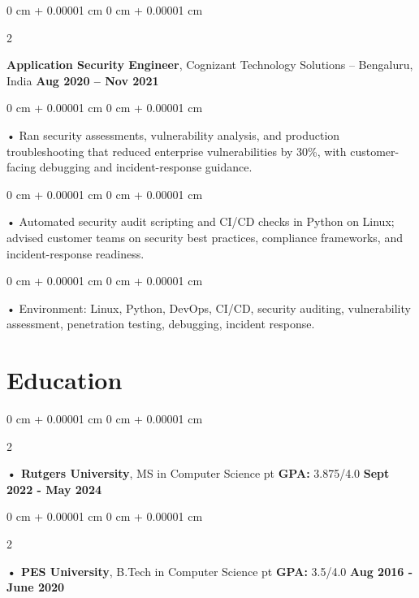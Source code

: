 \documentclass[10pt, letterpaper]{article}
\newenvironment{onecolentry}{
    \begin{adjustwidth}{
        0 cm + 0.00001 cm
    }{
        0 cm + 0.00001 cm
    }
}{
    \end{adjustwidth}
} %
\newenvironment{twocolentry}[2][]{
    \onecolentry
    \def\secondColumn{#2}
    \setcolumnwidth{\fill, 4.5 cm}
    \begin{paracol}{2}
}{
    \switchcolumn \raggedleft \secondColumn
    \end{paracol}
    \endonecolentry
} %
\begin{document}
        \begin{twocolentry}{
            \textbf{Aug 2020 – Nov 2021}
        }
            \textbf{Application Security Engineer}, Cognizant Technology Solutions -- Bengaluru, India\end{twocolentry}
        \begin{onecolentry}
             • Ran security assessments, vulnerability analysis, and production troubleshooting that reduced enterprise vulnerabilities by 30\%, with customer-facing debugging and incident-response guidance.
        \end{onecolentry}
        \begin{onecolentry}
             • Automated security audit scripting and CI/CD checks in Python on Linux; advised customer teams on security best practices, compliance frameworks, and incident-response readiness.
        \end{onecolentry}
        \begin{onecolentry}
             • Environment: Linux, Python, DevOps, CI/CD, security auditing, vulnerability assessment, penetration testing, debugging, incident response.
        \end{onecolentry}
    \vspace{2 pt }
        \section{Education}
        \vspace{2 pt }
        \begin{twocolentry}{
            \textbf{Sept 2022 - May 2024}
        }
            \textbf{ • Rutgers University}, MS in Computer Science  pt \textbf{GPA:} 3.875/4.0  \end{twocolentry}

        \begin{twocolentry}{
            \textbf{Aug 2016 - June 2020}
        }
            \textbf{ • PES University}, B.Tech in Computer Science  pt \textbf{GPA:} 3.5/4.0  \end{twocolentry}

\vspace{2 pt }
\end{document}

